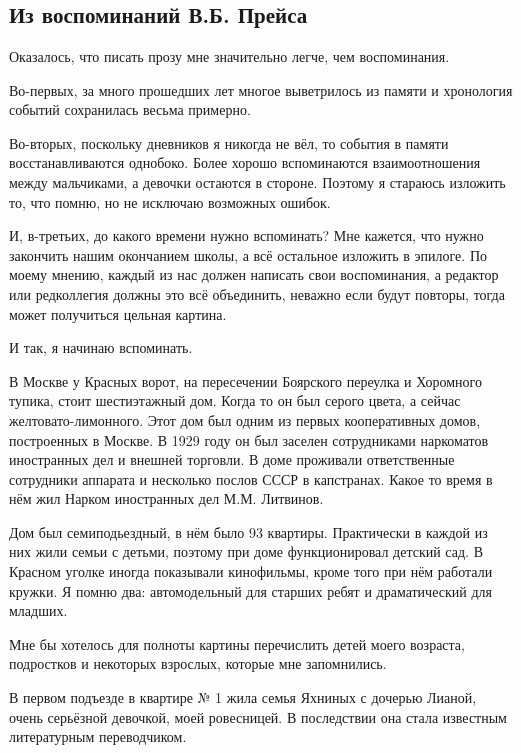\chapter{}
\section*{Из воспоминаний В.Б. Прейса}

Оказалось, что писать прозу мне значительно легче, чем воспоминания.

Во-первых, за много прошедших лет многое выветрилось из памяти и хронология событий сохранилась весьма примерно.

Во-вторых, поскольку дневников я никогда не вёл, то события в памяти восстанавливаются однобоко. Более хорошо вспоминаются взаимоотношения между мальчиками, а девочки остаются в стороне. Поэтому я стараюсь изложить то, что помню, но не исключаю возможных ошибок.

И, в-третьих, до какого времени нужно вспоминать? Мне кажется, что нужно закончить нашим окончанием школы, а всё остальное изложить в эпилоге. По моему мнению, каждый из нас должен написать свои воспоминания, а редактор или редколлегия должны это всё объединить, неважно если будут повторы, тогда может получиться цельная картина.

И так, я начинаю вспоминать.

\indent

В Москве у Красных ворот, на пересечении Боярского переулка и Хоромного тупика, стоит шестиэтажный дом. Когда то он был серого цвета, а сейчас желтовато-лимонного. Этот дом был одним из первых кооперативных домов, построенных в Москве. В 1929 году он был заселен сотрудниками наркоматов иностранных дел и внешней торговли. В доме проживали ответственные сотрудники аппарата и несколько послов СССР в капстранах. Какое то время в нём жил Нарком иностранных дел М.М. Литвинов.

Дом был семиподьездный, в нём было 93 квартиры. Практически в каждой из них жили семьи с детьми, поэтому при доме функционировал детский сад. В Красном уголке иногда показывали кинофильмы, кроме того при нём работали кружки. Я помню два: автомодельный для старших ребят и драматический для младших.

Мне бы хотелось для полноты картины перечислить детей моего возраста, подростков и некоторых взрослых, которые мне запомнились.

В первом подъезде в квартире № 1 жила семья Яхниных с дочерью Лианой, очень серьёзной девочкой, моей ровесницей. В последствии она стала известным литературным переводчиком.

